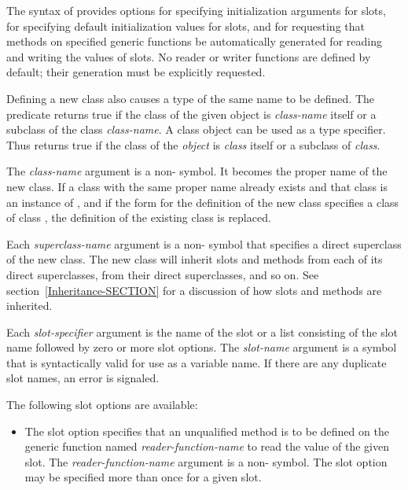 \begin{defmac}
The syntax of  provides options for specifying
initialization arguments for slots, for specifying default
initialization values for slots, and for requesting that methods on
specified generic functions be automatically generated for reading and
writing the values of slots.  No reader or writer functions are
defined by default; their generation must be explicitly requested.

Defining a new class also causes a type of the same name to be
defined.  The predicate  returns
true if the class of the given object is {\it class-name\/} itself or
a subclass of the class {\it class-name}.  A class object can be used
as a type specifier.  Thus  returns true
if the class of the {\it object\/} is {\it class\/} itself or a
subclass of {\it class}.





The {\it class-name\/} argument is a non- symbol.  It becomes
the proper name of the new class.  If a class with the same proper
name already exists and that class is an instance of 
, and if the  form for the definition of the
new class specifies a class of class , the definition
of the existing class is replaced.

Each {\it superclass-name\/} argument is a non- symbol that
specifies a direct superclass of the new class.  The new class will
inherit slots and methods from each of its direct superclasses, from
their direct superclasses, and so on.  See
section~\ref{Inheritance-SECTION}
for a discussion of how slots and methods are inherited.

Each {\it slot-specifier\/} argument is the name of the slot or a list
consisting of the slot name followed by zero or more slot options.
The {\it slot-name\/} argument is a symbol that is syntactically valid
for use as a variable name.  If there are any duplicate
slot names, an error is signaled.

The following slot options are available:

\begin{itemize}

\item 
The  slot option specifies that an unqualified method is
to be defined on the generic function named {\it
reader-function-name\/} to read the value of the given slot.
The {\it reader-function-name\/} argument is a non-
symbol.  The  slot option may be specified more than once
for a given slot.


\end{itemize}
\end{defmac}
